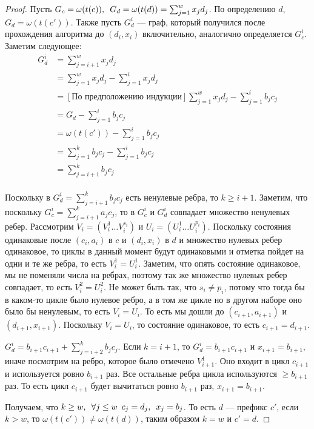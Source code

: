 \documentclass{article}
\newcommand{\squad}{
    \hspace{0.5em}
}
\begin{document}
\begin{proof}
    Пусть $G_{c} = \omega(t(c)), \squad G_{d} = \omega(t(d)) = \sum_{j = 1}^{w}{x_{j}d_{j}}$. По определению $d$, $G_{d} = \omega(t(c'))$. Также пусть $G_{d}^{i}$ --- граф, который получился после прохождения алгоритма до $(d_{i}, x_{i})$ включительно, аналогично определяется $G_{c}^{i}$.
    Заметим следующее:
    \begin{align*}
        G_{d}^{i} &= \sum_{j = i + 1}^{w}{x_{j}d_{j}} \\
                  &= \sum_{j = 1}^{w}{x_{j}d_{j}} - \sum_{j = 1}^{i}{x_{j}d_{j}} \\ 
                  &= \left[\text{По предположению индукции}\right] \sum_{j = 1}^{w}{x_{j}d_{j}} - \sum_{j = 1}^{i}{b_{j}c_{j}} \\
                  &= G_{d} - \sum_{j = 1}^{i}{b_{j}c_{j}} \\
                  &= \omega(t(c')) - \sum_{j = 1}^{i}{b_{j}c_{j}} \\
                  &= \sum_{j = 1}^{k}{b_{j}c_{j}} - \sum_{j = 1}^{i}{b_{j}c_{j}} \\
                  &= \sum_{j = i + 1}^{k}{b_{j}c_{j}} \\
    \end{align*}

    Поскольку в $G_{d}^{i} = \sum_{j = i + 1}^{k}{b_{j}c_{j}}$ есть ненулевые ребра, то $k \geq i + 1$.
    Заметим, что поскольку $G_{c}^{i} = \sum_{j = i + 1}^{k}{a_{j}c_{j}}$, то в $G_{c}^{i}$ и $G_{d}^{i}$ совпадает множество ненулевых ребер. Рассмотрим $V_{i} = (V_{i}^{1} \ldots V_{i}^{s_{i}})$ и $U_{i} = (U_{i}^{1} \ldots U_{i}^{p_{i}})$. Поскольку состояния одинаковые после $(c_{i}, a_{i})$ в $c$ и $(d_{i}, x_{i})$ в $d$ и множество нулевых ребер одинаковое, то циклы в данный момент будут одинаковыми и отметка пойдет на одни и те же ребра, то есть $V_{i}^{1} = U_{i}^{1}$. Заметим, что опять состояние одинаковое, мы не поменяли числа на ребрах, поэтому так же множество нулевых ребер совпадает, то есть $V_{i}^{2} = U_{i}^{2}$. Не может быть так, что $s_{i} \neq p_{i}$, потому что тогда бы в каком-то цикле было нулевое ребро, а в том же цикле но в другом наборе оно было бы ненулевым, то есть $V_{i} = U_{i}$. То есть мы дошли до $(c_{i + 1}, a_{i + 1})$ и $(d_{i + 1}, x_{i + 1})$. Поскольку $V_{i} = U_{i}$, то состояние одинаковое, то есть $c_{i + 1} = d_{i + 1}$.

    $G_{d}^{i} = b_{i + 1}c_{i + 1} + \sum_{j = i + 2}^{k}{b_{j}c_{j}}$. Если $k = i + 1$, то $G_{d}^{i} = b_{i + 1}c_{i + 1}$ и $x_{i + 1} = b_{i + 1}$, иначе посмотрим на ребро, которое было отмечено $V_{i + 1}^{1}$. Оно входит в цикл $c_{i + 1}$ и используется ровно $b_{i + 1}$ раз. Все остальные ребра цикла используются $\geq b_{i + 1}$ раз. То есть цикл $c_{i + 1}$ будет вычитаться ровно $b_{i + 1}$ раз, $x_{i + 1} = b_{i + 1}$.

    \medskip

    Получаем, что $k \geq w, \squad \forall j \leq w$ $c_{j} = d_{j}, \squad x_{j} = b_{j}$. То есть $d$ --- префикс $c'$, если $k > w$, 
    то $\omega(t(c')) \neq \omega(t(d))$, таким образом $k = w$ и $c' = d$. 
\end{proof}
\end{document}
